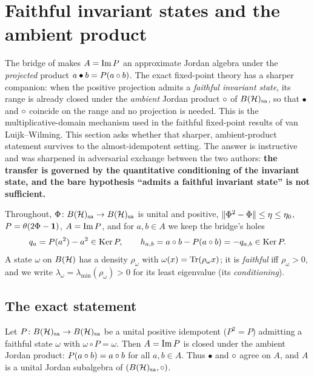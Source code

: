 \section{Faithful invariant states and the ambient product}\label{sec:faithful}

The bridge of  makes $A=\operatorname{Im} P$ an approximate Jordan algebra
under the \emph{projected} product $a\bullet b=P(a\circ b)$. The exact
fixed-point theory has a sharper companion: when the positive projection admits
a \emph{faithful invariant state}, its range is already closed under the
\emph{ambient} Jordan product $\circ$ of $B(\mathcal{H})_{\mathrm{sa}}$, so that $\bullet$ and $\circ$
coincide on the range and no projection is needed. This is the
multiplicative-domain mechanism used in the faithful fixed-point results of
van Luijk--Wilming. This section asks whether that sharper, ambient-product
statement survives to the almost-idempotent setting. The answer is instructive
and was sharpened in adversarial exchange between the two authors: \textbf{the
transfer is governed by the quantitative conditioning of the invariant state,
and the bare hypothesis ``admits a faithful invariant state'' is not
sufficient.}

Throughout, $\Phi\colon B(\mathcal{H})_{\mathrm{sa}}\to B(\mathcal{H})_{\mathrm{sa}}$ is unital and positive,
$\lVert \Phi^2-\Phi \rVert\le\eta\le\eta_0$, $P=\theta(2\Phi-\mathbf{1})$,
$A=\operatorname{Im} P$, and for $a,b\in A$ we keep the bridge's holes
\[
  q_a=P(a^2)-a^2\in\operatorname{Ker} P,\qquad
  h_{a,b}=a\circ b-P(a\circ b)=-q_{a,b}\in\operatorname{Ker} P .
\]
A state $\omega$ on $B(\mathcal{H})$ has a density $\rho_\omega$ with
$\omega(x)=\operatorname{Tr}(\rho_\omega x)$; it is \emph{faithful} iff $\rho_\omega>0$, and we
write $\lambda_\omega=\lambda_{\min}(\rho_\omega)>0$ for its least eigenvalue
(its \emph{conditioning}).

\subsection*{The exact statement}

\begin{proposition}
\label{prop:faithful-exact}
Let $P\colon B(\mathcal{H})_{\mathrm{sa}}\to B(\mathcal{H})_{\mathrm{sa}}$ be a unital positive idempotent ($P^2=P$) admitting a
faithful state $\omega$ with $\omega\circ P=\omega$. Then $A=\operatorname{Im} P$ is closed
under the ambient Jordan product: $P(a\circ b)=a\circ b$ for all $a,b\in A$. Thus
$\bullet$ and $\circ$ agree on $A$, and $A$ is a unital Jordan subalgebra of
$(B(\mathcal{H})_{\mathrm{sa}},\circ)$.
\end{proposition}

